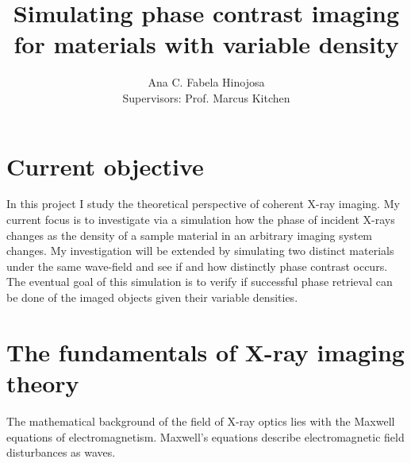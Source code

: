 \documentclass[9pt, a4paper]{article}
\title{Simulating phase contrast imaging for materials with variable density}
\author{Ana C. Fabela Hinojosa \\
\small{Supervisors: Prof. Marcus Kitchen}}
\begin{document}
\maketitle
\section{Current objective}
In this project I study the theoretical perspective of coherent X-ray imaging. My current focus is to investigate via a simulation how the phase of incident X-rays changes as the density of a sample material in an arbitrary imaging system changes. My investigation will be extended by simulating two distinct materials under the same wave-field and see if and how distinctly phase contrast occurs. The eventual goal of this simulation is to verify if successful phase retrieval can be done of the imaged objects given their variable densities.

\section{The fundamentals of X-ray imaging theory}
The mathematical background of the field of X-ray optics lies with the Maxwell equations of electromagnetism\cite{PagsTutes}. Maxwell's equations describe electromagnetic field disturbances as waves.
\end{document}
